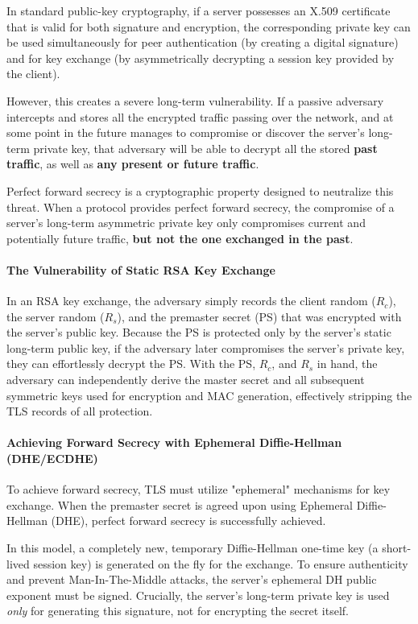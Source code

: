 In standard public-key cryptography, if a server possesses an X.509 certificate that is valid for both signature and encryption, the corresponding private key can be used simultaneously for peer authentication (by creating a digital signature) and for key exchange (by asymmetrically decrypting a session key provided by the client).

However, this creates a severe long-term vulnerability. If a passive adversary intercepts and stores all the encrypted traffic passing over the network, and at some point in the future manages to compromise or discover the server's long-term private key, that adversary will be able to decrypt all the stored \textbf{past traffic}, as well as \textbf{any present or future traffic}.

Perfect forward secrecy is a cryptographic property designed to neutralize this threat. When a protocol provides perfect forward secrecy, the compromise of a server's long-term asymmetric private key only compromises current and potentially future traffic, \textbf{but not the one exchanged in the past}.

\paragraph{The Vulnerability of Static RSA Key Exchange}
In an RSA key exchange, the adversary simply records the client random ($R_c$), the server random ($R_s$), and the premaster secret (PS) that was encrypted with the server's public key. Because the PS is protected only by the server's static long-term public key, if the adversary later compromises the server's private key, they can effortlessly decrypt the PS. With the PS, $R_c$, and $R_s$ in hand, the adversary can independently derive the master secret and all subsequent symmetric keys used for encryption and MAC generation, effectively stripping the TLS records of all protection.

\paragraph{Achieving Forward Secrecy with Ephemeral Diffie-Hellman (DHE/ECDHE)}
To achieve forward secrecy, TLS must utilize "ephemeral" mechanisms for key exchange. When the premaster secret is agreed upon using Ephemeral Diffie-Hellman (DHE), perfect forward secrecy is successfully achieved.

In this model, a completely new, temporary Diffie-Hellman one-time key (a short-lived session key) is generated on the fly for the exchange. To ensure authenticity and prevent Man-In-The-Middle attacks, the server's ephemeral DH public exponent must be signed. Crucially, the server's long-term private key is used \textit{only} for generating this signature, not for encrypting the secret itself.

